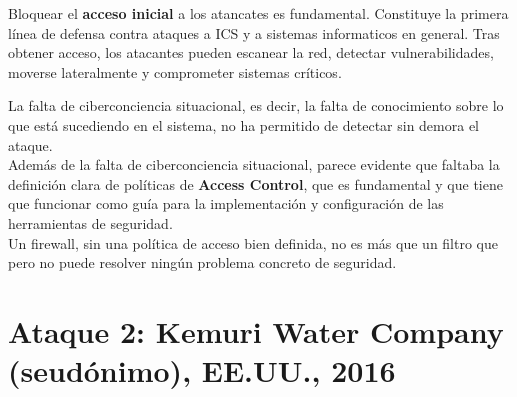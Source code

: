 Bloquear el \textbf{acceso inicial} a los atancates es fundamental. Constituye la primera línea de defensa contra ataques a ICS y a sistemas informaticos en general. Tras obtener acceso, los atacantes pueden escanear la red, detectar vulnerabilidades, moverse lateralmente y comprometer sistemas críticos.

La falta de ciberconciencia situacional, es decir, la falta de conocimiento sobre lo que está sucediendo en el sistema, no ha permitido de detectar sin demora el ataque.\\
Además de la falta de ciberconciencia situacional, parece evidente que faltaba la definición clara de políticas de \textbf{Access Control}, que es fundamental y que tiene que funcionar como guía para la implementación y configuración de las herramientas de seguridad.\\
Un firewall, sin una política de acceso bien definida, no es más que un filtro que pero no puede resolver ningún problema concreto de seguridad.
\newpage


\section{Ataque 2: Kemuri Water Company (seudónimo), EE.UU., 2016}

